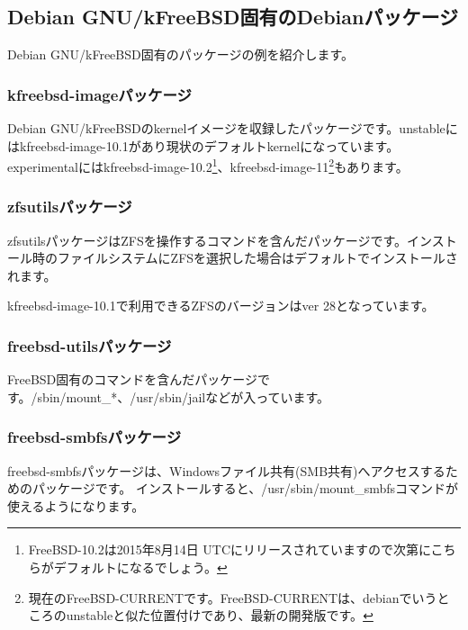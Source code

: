 \documentclass[mingoth,a4paper]{jsarticle}
\begin{document}
\subsection{Debian GNU/kFreeBSD固有のDebianパッケージ}

Debian GNU/kFreeBSD固有のパッケージの例を紹介します。

\subsubsection{kfreebsd-imageパッケージ}

Debian GNU/kFreeBSDのkernelイメージを収録したパッケージです。unstableにはkfreebsd-image-10.1があり現状のデフォルトkernelになっています。experimentalにはkfreebsd-image-10.2\footnote{FreeBSD-10.2は2015年8月14日 UTCにリリースされていますので次第にこちらがデフォルトになるでしょう。}、kfreebsd-image-11\footnote{現在のFreeBSD-CURRENTです。FreeBSD-CURRENTは、debianでいうところのunstableと似た位置付けであり、最新の開発版です。}もあります。

\subsubsection{zfsutilsパッケージ}

zfsutilsパッケージはZFSを操作するコマンドを含んだパッケージです。インストール時のファイルシステムにZFSを選択した場合はデフォルトでインストールされます。

kfreebsd-image-10.1で利用できるZFSのバージョンはver 28となっています。


\subsubsection{freebsd-utilsパッケージ}

FreeBSD固有のコマンドを含んだパッケージです。/sbin/mount\_*、/usr/sbin/jailなどが入っています。

\subsubsection{freebsd-smbfsパッケージ}

freebsd-smbfsパッケージは、Windowsファイル共有(SMB共有)へアクセスするためのパッケージです。
インストールすると、/usr/sbin/mount\_smbfsコマンドが使えるようになります。
\end{document}
